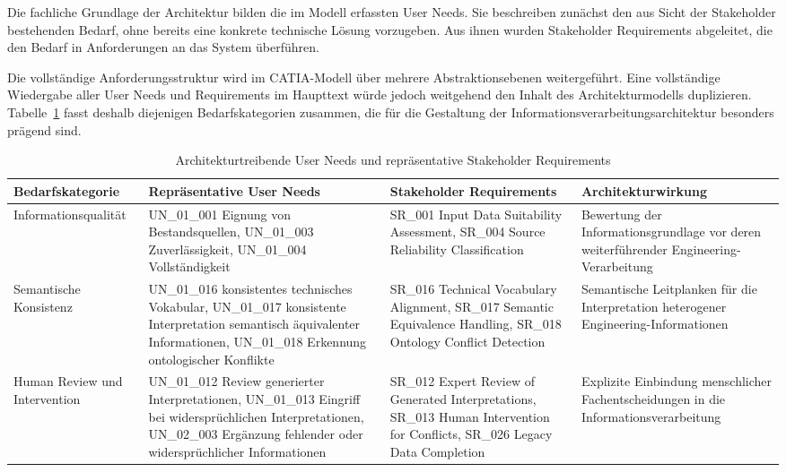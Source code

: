 Die fachliche Grundlage der Architektur bilden die im Modell erfassten
User Needs. Sie beschreiben zunächst den aus Sicht der Stakeholder bestehenden
Bedarf, ohne bereits eine konkrete technische Lösung vorzugeben. Aus ihnen
wurden Stakeholder Requirements abgeleitet, die den Bedarf in Anforderungen an
das System überführen.

Die vollständige Anforderungsstruktur wird im CATIA-Modell über mehrere
Abstraktionsebenen weitergeführt. Eine vollständige Wiedergabe aller User Needs
und Requirements im Haupttext würde jedoch weitgehend den Inhalt des
Architekturmodells duplizieren. Tabelle~\ref{tab:architekturtreibende_requirements}
fasst deshalb diejenigen Bedarfskategorien zusammen, die für die Gestaltung der
Informationsverarbeitungsarchitektur besonders prägend sind.

\begin{table}[htbp]
\caption{Architekturtreibende User Needs und repräsentative Stakeholder Requirements}
\label{tab:architekturtreibende_requirements}
\centering
\small
\begin{tabular}{|p{2.8cm}|p{4.3cm}|p{4.2cm}|p{4.3cm}|}
\hline
\textbf{Bedarfskategorie} &
\textbf{Repräsentative User Needs} &
\textbf{Stakeholder Requirements} &
\textbf{Architekturwirkung} \\
\hline

Informationsqualität &
UN\_01\_001 Eignung von Bestandsquellen,
UN\_01\_003 Zuverlässigkeit,
UN\_01\_004 Vollständigkeit &
SR\_001 Input Data Suitability Assessment,
SR\_004 Source Reliability Classification &
Bewertung der Informationsgrundlage vor deren weiterführender
Engineering-Verarbeitung \\
\hline

Semantische Konsistenz &
UN\_01\_016 konsistentes technisches Vokabular,
UN\_01\_017 konsistente Interpretation semantisch äquivalenter Informationen,
UN\_01\_018 Erkennung ontologischer Konflikte &
SR\_016 Technical Vocabulary Alignment,
SR\_017 Semantic Equivalence Handling,
SR\_018 Ontology Conflict Detection &
Semantische Leitplanken für die Interpretation heterogener
Engineering-Informationen \\
\hline

Human Review und Intervention &
UN\_01\_012 Review generierter Interpretationen,
UN\_01\_013 Eingriff bei widersprüchlichen Interpretationen,
UN\_02\_003 Ergänzung fehlender oder widersprüchlicher Informationen &
SR\_012 Expert Review of Generated Interpretations,
SR\_013 Human Intervention for Conflicts,
SR\_026 Legacy Data Completion &
Explizite Einbindung menschlicher Fachentscheidungen in die
Informationsverarbeitung \\
\hline


\end{tabular}
\end{table}
